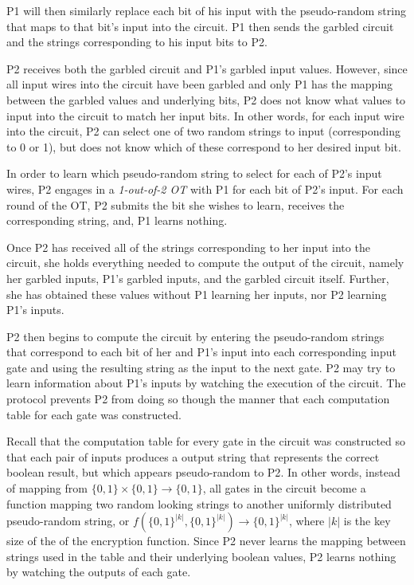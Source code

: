 \ac{P1} will then similarly replace each bit of his input with the pseudo-random string that maps to that bit's input into the circuit. \ac{P1} then sends the garbled circuit and the strings corresponding to his input bits to \ac{P2}.

\ac{P2} receives both the garbled circuit and \ac{P1}'s garbled input values. However, since all input wires into the circuit have been garbled and only \ac{P1} has the mapping between the garbled values and underlying bits, \ac{P2} does not know what values to input into the circuit to match her input bits.
In other words, for each input wire into the circuit, \ac{P2} can select one of two random strings to input (corresponding to 0 or 1), but does not know which of these correspond to her desired input bit.

In order to learn which pseudo-random string to select for each of \ac{P2}'s input wires, \ac{P2} engages in a \emph{1-out-of-2 \ac{OT}} with \ac{P1} for each bit of \ac{P2}'s input. For each round of the \ac{OT}, \ac{P2} submits the bit she wishes to learn, receives the corresponding string, and, \ac{P1} learns nothing.

Once \ac{P2} has received all of the strings corresponding to her input into the circuit, she holds everything needed to compute the output of the circuit, namely her garbled inputs, \ac{P1}'s garbled inputs, and the garbled circuit itself. Further, she has obtained these values without \ac{P1} learning her inputs, nor \ac{P2} learning \ac{P1}'s inputs.

\ac{P2} then begins to compute the circuit by entering the pseudo-random strings that correspond to each bit of her and \ac{P1}'s input into each corresponding input gate and using the resulting string as the input to the next gate. \ac{P2} may try to learn information about \ac{P1}'s inputs by watching the execution of the circuit. The protocol prevents \ac{P2} from doing so though the manner that each computation table for each gate was constructed.

Recall that the computation table for every gate in the circuit was constructed so that each pair of inputs produces a output string that represents the correct boolean result, but which appears pseudo-random to \ac{P2}.  In other words, instead of mapping from $\{0, 1\} \times \{0, 1\} \to \{0, 1\}$, all gates in the circuit become a function mapping two random looking strings to another uniformly distributed pseudo-random string, or $f(\{0, 1\}^{|k|}, \{0, 1\}^{|k|}) \to \{0, 1\}^{|k|}$, where $|k|$ is the key size of the of the encryption function. Since \ac{P2} never learns the mapping between strings used in the table and their underlying boolean values, \ac{P2} learns nothing by watching the outputs of each gate.

